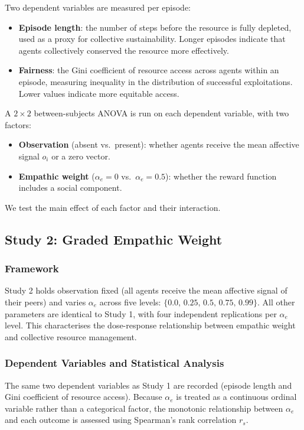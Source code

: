 Two dependent variables are measured per episode:
\begin{itemize}
    \item \textbf{Episode length}: the number of steps before the resource
          is fully depleted, used as a proxy for collective sustainability.
          Longer episodes indicate that agents collectively conserved the
          resource more effectively.
    \item \textbf{Fairness}: the Gini coefficient of resource access across
          agents within an episode, measuring inequality in the distribution
          of successful exploitations. Lower values indicate more equitable
          access.
\end{itemize}

A $2 \times 2$ between-subjects ANOVA is run on each dependent variable,
with two factors:
\begin{itemize}
    \item \textbf{Observation} (absent vs.\ present): whether agents receive
          the mean affective signal $o_i$ or a zero vector.
    \item \textbf{Empathic weight} ($\alpha_e = 0$ vs.\ $\alpha_e = 0.5$):
          whether the reward function includes a social component.
\end{itemize}
We test the main effect of each factor and their interaction.

\subsection{Study 2: Graded Empathic Weight}

\subsubsection{Framework}

Study 2 holds observation fixed (all agents receive the mean affective
signal of their peers) and varies $\alpha_e$ across five levels:
$\{0.0,\, 0.25,\, 0.5,\, 0.75,\, 0.99\}$. All other parameters are
identical to Study 1, with four independent replications per $\alpha_e$ level.
This characterises the dose-response relationship between empathic weight and
collective resource management.

\subsubsection{Dependent Variables and Statistical Analysis}

The same two dependent variables as Study 1 are recorded (episode length
and Gini coefficient of resource access). Because $\alpha_e$ is treated
as a continuous ordinal variable rather than a categorical factor, the
monotonic relationship between $\alpha_e$ and each outcome is assessed
using Spearman's rank correlation $r_s$.
